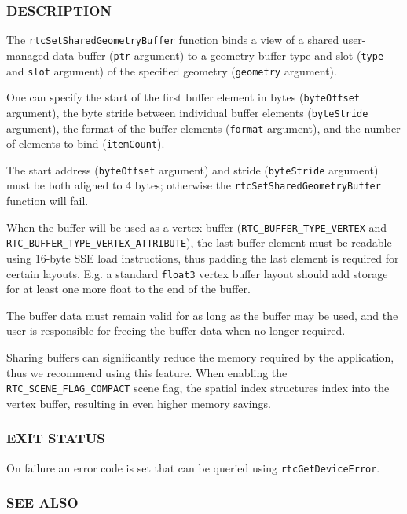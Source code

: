 \subsubsection{DESCRIPTION}\label{description}

The \texttt{rtcSetSharedGeometryBuffer} function binds a view of a
shared user-managed data buffer (\texttt{ptr} argument) to a geometry
buffer type and slot (\texttt{type} and \texttt{slot} argument) of the
specified geometry (\texttt{geometry} argument).

One can specify the start of the first buffer element in bytes
(\texttt{byteOffset} argument), the byte stride between individual
buffer elements (\texttt{byteStride} argument), the format of the buffer
elements (\texttt{format} argument), and the number of elements to bind
(\texttt{itemCount}).

The start address (\texttt{byteOffset} argument) and stride
(\texttt{byteStride} argument) must be both aligned to 4 bytes;
otherwise the \texttt{rtcSetSharedGeometryBuffer} function will fail.

When the buffer will be used as a vertex buffer
(\texttt{RTC\_BUFFER\_TYPE\_VERTEX} and
\texttt{RTC\_BUFFER\_TYPE\_VERTEX\_ATTRIBUTE}), the last buffer element
must be readable using 16-byte SSE load instructions, thus padding the
last element is required for certain layouts. E.g. a standard
\texttt{float3} vertex buffer layout should add storage for at least one
more float to the end of the buffer.

The buffer data must remain valid for as long as the buffer may be used,
and the user is responsible for freeing the buffer data when no longer
required.

Sharing buffers can significantly reduce the memory required by the
application, thus we recommend using this feature. When enabling the
\texttt{RTC\_SCENE\_FLAG\_COMPACT} scene flag, the spatial index
structures index into the vertex buffer, resulting in even higher memory
savings.

\subsubsection{EXIT STATUS}\label{exit-status}

On failure an error code is set that can be queried using
\texttt{rtcGetDeviceError}.

\subsubsection{SEE ALSO}\label{see-also}

